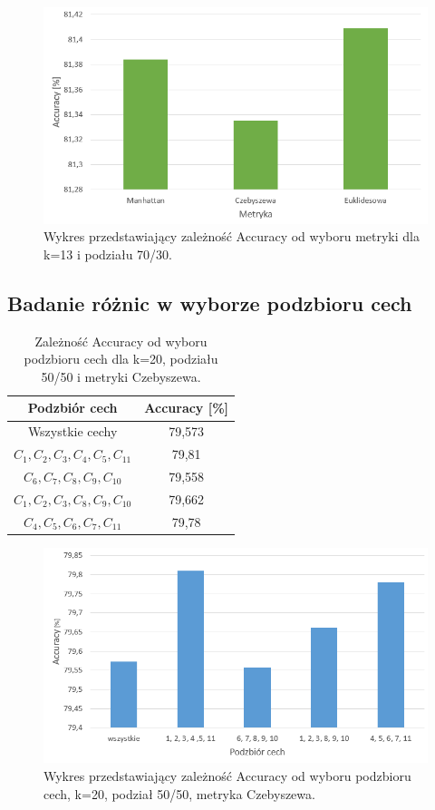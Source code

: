 \documentclass{classrep}
\begin{document}
\begin{figure}[h!]
    \centering
    \includegraphics[width=1\textwidth]{accuracyMetric.png}
    \caption{Wykres przedstawiający zależność Accuracy od wyboru metryki dla k=13 i podziału 70/30.}
    \label{accuracyMetric}
\end{figure}

\newpage
\subsection{Badanie różnic w wyborze podzbioru cech}
\begin{table}[h!]
	\centering
	\begin{tabular} {c c}
		\hline
		\textbf{Podzbiór cech} & \textbf{Accuracy [\%]} \\ [0.5ex] 
		\hline
		\hline 
		Wszystkie cechy & 79,573 \\ 
		$C_1, C_2, C_3, C_4, C_5, C_{11}$ & 79,81 \\
		$C_6, C_7, C_8, C_9, C_{10}$ & 79,558 \\
		$C_1, C_2, C_3, C_8, C_9, C_{10}$ & 79,662 \\
		$C_4, C_5, C_6, C_7, C_{11}$ & 79,78 \\
		\hline
	\end{tabular}
	\caption{Zależność Accuracy od wyboru podzbioru cech dla k=20, podziału 50/50 i metryki Czebyszewa. }
	\label{tabelaFeatures}
\end{table}

\begin{figure}[h!]
    \centering
    \includegraphics[width=1\textwidth]{accuracyFeatures.png}
    \caption{Wykres przedstawiający zależność Accuracy od wyboru podzbioru cech, k=20, podział 50/50, metryka Czebyszewa.}
    \label{accuracyFeatures}
\end{figure}
\end{document}
